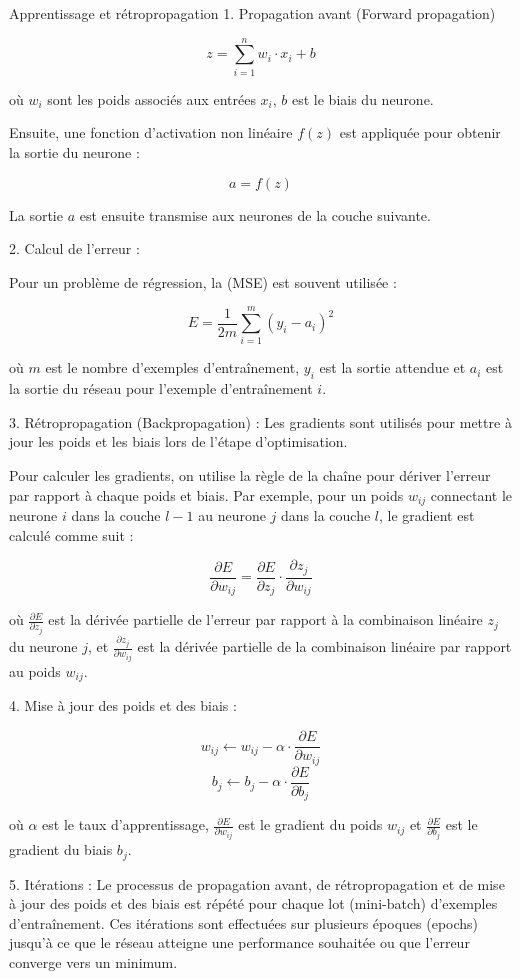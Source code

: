 \documentclass{beamer}
\begin{document}
\begin{frame}{Apprentissage et rétropropagation  }
	1. Propagation avant (Forward propagation)
	
	
	\[z = \sum_{i=1}^{n} w_i \cdot x_i + b\]
	
	où \(w_i\) sont les poids associés aux entrées \(x_i\), \(b\) est le biais du neurone.
	
	Ensuite, une fonction d'activation non linéaire \(f(z)\) est appliquée pour obtenir la sortie du neurone :
	
	\[a = f(z)\]
	
	La sortie \(a\) est ensuite transmise aux neurones de la couche suivante.
	
	2. Calcul de l'erreur :
	
	Pour un problème de régression, la (MSE) est souvent utilisée :
	
	\[E = \frac{1}{2m} \sum_{i=1}^{m} (y_i - a_i)^2\]
	
	où \(m\) est le nombre d'exemples d'entraînement, \(y_i\) est la sortie attendue et \(a_i\) est la sortie du réseau pour l'exemple d'entraînement \(i\).
	
	3. Rétropropagation (Backpropagation) :
	Les gradients sont utilisés pour mettre à jour les poids et les biais lors de l'étape d'optimisation.
	
	Pour calculer les gradients, on utilise la règle de la chaîne pour dériver l'erreur par rapport à chaque poids et biais. Par exemple, pour un poids \(w_{ij}\) connectant le neurone \(i\) dans la couche \(l-1\) au neurone \(j\) dans la couche \(l\), le gradient est calculé comme suit :
	
	\[\frac{\partial E}{\partial w_{ij}} = \frac{\partial E}{\partial z_j} \cdot \frac{\partial z_j}{\partial w_{ij}}\]
	
	où \(\frac{\partial E}{\partial z_j}\) est la dérivée partielle de l'erreur par rapport à la combinaison linéaire \(z_j\) du neurone \(j\), et \(\frac{\partial z_j}{\partial w_{ij}}\) est la dérivée partielle de la combinaison linéaire par rapport au poids \(w_{ij}\).
	
	4. Mise à jour des poids et des biais :
	
	\[w_{ij} \leftarrow w_{ij} - \alpha \cdot \frac{\partial E}{\partial w_{ij}}\]
	\[b_j \leftarrow b_j - \alpha \cdot \frac{\partial E}{\partial b_j}\]
	
	où \(\alpha\) est le taux d'apprentissage, \(\frac{\partial E}{\partial w_{ij}}\) est le gradient du poids \(w_{ij}\) et \(\frac{\partial E}{\partial b_j}\) est le gradient du biais \(b_j\).
	
	5. Itérations :
	Le processus de propagation avant, de rétropropagation et de mise à jour des poids et des biais est répété pour chaque lot (mini-batch) d'exemples d'entraînement. Ces itérations sont effectuées sur plusieurs époques (epochs) jusqu'à ce que le réseau atteigne une performance souhaitée ou que l'erreur converge vers un minimum.
\end{frame}
\end{document}
